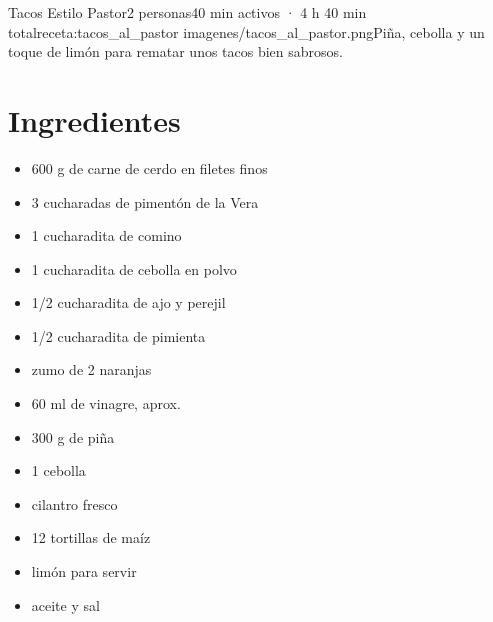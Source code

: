 \begin{recetaConImagen}{Tacos Estilo Pastor}{2 personas}{40 min activos · 4 h 40 min total}{receta:tacos_al_pastor}
    {imagenes/tacos_al_pastor.png}{Piña, cebolla y un toque de limón para rematar unos tacos bien sabrosos.}


    \begin{minipage}[t]{0.35\textwidth}
        \section*{Ingredientes}
        \begin{itemize}[leftmargin=*]
            \item 600 g de carne de cerdo en filetes finos
            \item 3 cucharadas de pimentón de la Vera
            \item 1 cucharadita de comino
            \item 1 cucharadita de cebolla en polvo
            \item 1/2 cucharadita de ajo y perejil
            \item 1/2 cucharadita de pimienta
            \item zumo de 2 naranjas
            \item 60 ml de vinagre, aprox.
            \item 300 g de piña
            \item 1 cebolla
            \item cilantro fresco
            \item 12 tortillas de maíz
            \item limón para servir
            \item aceite y sal
        \end{itemize}
    \end{minipage}
    \hfill
    \begin{minipage}[t]{0.6\textwidth}

\end{minipage}
\end{recetaConImagen}
